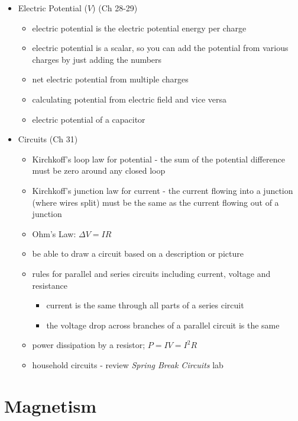 \begin{itemize}
\item Electric Potential ($V$) (Ch 28-29)
\begin{itemize}
\item electric potential is the electric potential energy per charge
\item electric potential is a scalar, so you can add the potential from various charges by just adding the numbers
\item net electric potential from multiple charges
\item calculating potential from electric field and vice versa
\item electric potential of a capacitor
\end{itemize}

\item Circuits (Ch 31)
\begin{itemize}
\item Kirchkoff's loop law for potential - the sum of the potential
  difference must be zero around any closed loop
\item Kirchkoff's junction law for current - the current flowing into
  a junction (where wires split) must be the same as the current
  flowing out of a junction
\item Ohm's Law: $\Delta V = I R$
\item be able to draw a circuit based on a description or picture
\item rules for parallel and series circuits including current,
  voltage and resistance
\begin{itemize}
\item current is the same through all parts of a series circuit
\item the voltage drop across branches of a parallel circuit is the
same
\end{itemize}
\item power dissipation by a resistor; $P = IV = I^2 R$
\item household circuits - review {\it Spring Break Circuits} lab
\end{itemize}
\end{itemize}

\section{Magnetism} %

